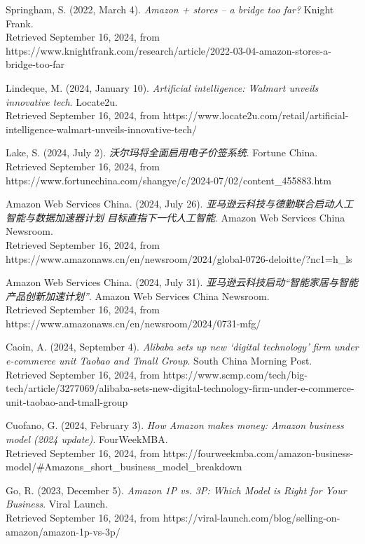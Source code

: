 \documentclass[12pt]{ctexart}
\begin{document}
\begin{thebibliography}{99}
     Springham, S. (2022, March 4). \textit{Amazon + stores – a bridge too far?} Knight Frank.  \\ Retrieved September 16, 2024, from https://www.knightfrank.com/research/article/2022-03-04-amazon-stores-a-bridge-too-far

     Lindeque, M. (2024, January 10). \textit{Artificial intelligence: Walmart unveils innovative tech}. Locate2u. \\ Retrieved September 16, 2024, from https://www.locate2u.com/retail/artificial-intelligence-walmart-unveils-innovative-tech/

     Lake, S. (2024, July 2). \textit{沃尔玛将全面启用电子价签系统}. Fortune China.\\ Retrieved September 16, 2024, from https://www.fortunechina.com/shangye/c/2024-07/02/content\_455883.htm

     Amazon Web Services China. (2024, July 26). \textit{亚马逊云科技与德勤联合启动人工智能与数据加速器计划 目标直指下一代人工智能}. Amazon Web Services China Newsroom.\\ Retrieved September 16, 2024, from https://www.amazonaws.cn/en/newsroom/2024/global-0726-deloitte/?nc1=h\_ls

     Amazon Web Services China. (2024, July 31). \textit{亚马逊云科技启动“智能家居与智能产品创新加速计划”}. Amazon Web Services China Newsroom. \\ Retrieved September 16, 2024, from https://www.amazonaws.cn/en/newsroom/2024/0731-mfg/

     Caoin, A. (2024, September 4). \textit{Alibaba sets up new ‘digital technology’ firm under e-commerce unit Taobao and Tmall Group}. South China Morning Post. \\ Retrieved September 16, 2024, from https://www.scmp.com/tech/big-tech/article/3277069/alibaba-sets-new-digital-technology-firm-under-e-commerce-unit-taobao-and-tmall-group

     Cuofano, G. (2024, February 3). \textit{How Amazon makes money: Amazon business model (2024 update)}. FourWeekMBA. \\ Retrieved September 16, 2024, from https://fourweekmba.com/amazon-business-model/\#Amazons\_short\_business\_model\_breakdown

     Go, R. (2023, December 5). \textit{Amazon 1P vs. 3P: Which Model is Right for Your Business}. Viral Launch. \\ Retrieved September 16, 2024, from https://viral-launch.com/blog/selling-on-amazon/amazon-1p-vs-3p/


\end{thebibliography}
\end{document}
